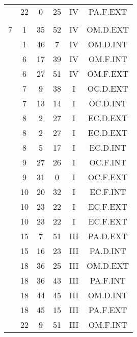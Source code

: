\documentclass[12pt, a4paper]{article}
\begin{document}
\begin{multicols}{3}
{\begin{tabular}{c c c c c c}
	 	 	 	 & 22 & 0 & 25 & IV & PA.F.EXT\\%
	 	 	 	 & & & & & \\%
	 	 	 	7 & 1 & 35 & 52 & IV & OM.D.EXT\\%
	 	 	 	 & 1 & 46 & 7 & IV & OM.D.INT\\%
	 	 	 	 & 6 & 17 & 39 & IV & OM.F.INT\\%
	 	 	 	 & 6 & 27 & 51 & IV & OM.F.EXT\\%
	 	 	 	 & 7 & 9 & 38 & I & OC.D.EXT\\%
	 	 	 	 & 7 & 13 & 14 & I & OC.D.INT\\%
	 	 	 	 & 8 & 2 & 27 & I & EC.D.EXT\\%
	 	 	 	 & 8 & 2 & 27 & I & EC.D.EXT\\%
	 	 	 	 & 8 & 5 & 17 & I & EC.D.INT\\%
	 	 	 	 & 9 & 27 & 26 & I & OC.F.INT\\%
	 	 	 	 & 9 & 31 & 0 & I & OC.F.EXT\\%
	 	 	 	 & 10 & 20 & 32 & I & EC.F.INT\\%
	 	 	 	 & 10 & 23 & 22 & I & EC.F.EXT\\%
	 	 	 	 & 10 & 23 & 22 & I & EC.F.EXT\\%
	 	 	 	 & 15 & 7 & 51 & III & PA.D.EXT\\%
	 	 	 	 & 15 & 16 & 23 & III & PA.D.INT\\%
	 	 	 	 & 18 & 36 & 25 & III & OM.D.EXT\\%
	 	 	 	 & 18 & 36 & 43 & III & PA.F.INT\\%
	 	 	 	 & 18 & 44 & 45 & III & OM.D.INT\\%
	 	 	 	 & 18 & 45 & 15 & III & PA.F.EXT\\%
	 	 	 	 & 22 & 9 & 51 & III & OM.F.INT\\%

\end{tabular}}
\end{multicols}
\end{document}
